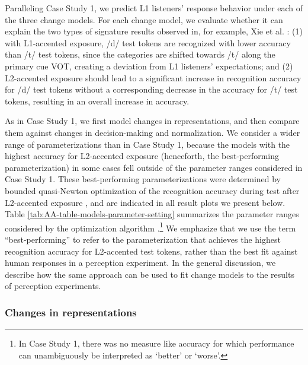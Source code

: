 \documentclass[
  11pt,
  man,floatsintext]{apa6}
\begin{document}
Paralleling Case Study 1, we predict L1 listeners' response behavior under each of the three change models. For each change model, we evaluate whether it can explain the two types of signature results observed in, for example, Xie et al. \autocite*{xie2016jep}: (1) with L1-accented exposure, /d/ test tokens are recognized with lower accuracy than /t/ test tokens, since the categories are shifted towards /t/ along the primary cue VOT, creating a deviation from L1 listeners' expectations; and (2) L2-accented exposure should lead to a significant increase in recognition accuracy for /d/ test tokens without a corresponding decrease in the accuracy for /t/ test tokens, resulting in an overall increase in accuracy.

As in Case Study 1, we first model changes in representations, and then compare them against changes in decision-making and normalization. We consider a wider range of parameterizations than in Case Study 1, because the models with the highest accuracy for L2-accented exposure (henceforth, the best-performing parameterization) in some cases fell outside of the parameter ranges considered in Case Study 1. These best-performing parameterizations were determined by bounded quasi-Newton optimization of the recognition accuracy during test after L2-accented exposure \autocite[implemented in function \texttt{optim()} in R]{byrd1995}, and are indicated in all result plots we present below. Table \ref{tab:AA-table-models-parameter-setting} summarizes the parameter ranges considered by the optimization algorithm \autocite[\(\nu_{c,0}\) must be larger than the number of cues \(k\) + 1,][p.~134]{murphy2012}.\footnote{In Case Study 1, there was no measure like accuracy for which performance can unambiguously be interpreted as `better' or `worse'.} We emphasize that we use the term ``best-performing'' to refer to the parameterization that achieves the highest recognition accuracy for L2-accented test tokens, rather than the best fit against human responses in a perception experiment. In the general discussion, we describe how the same approach can be used to fit change models to the results of perception experiments.

\hypertarget{changes-in-representations-1}{%
\subsubsection{Changes in representations}\label{changes-in-representations-1}}
\end{document}
